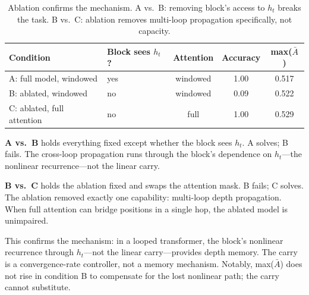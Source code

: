 \documentclass[11pt]{article}
\begin{document}
\begin{table}[ht]
\centering
\begin{tabular}{@{}llccc@{}}
\toprule
Condition & Block sees $h_t$? & Attention & Accuracy & max($\bar{A}$) \\
\midrule
A: full model, windowed & yes & windowed & 1.00 & 0.517 \\
B: ablated, windowed & no & windowed & 0.09 & 0.522 \\
C: ablated, full attention & no & full & 1.00 & 0.529 \\
\bottomrule
\end{tabular}
\caption{Ablation confirms the mechanism. A vs.\ B: removing block's access to $h_t$ breaks the task. B vs.\ C: ablation removes multi-loop propagation specifically, not capacity.}
\label{tab:ablation}
\end{table}

\textbf{A vs.\ B} holds everything fixed except whether the block sees $h_t$. A solves; B fails. The cross-loop propagation runs through the block's dependence on $h_t$---the nonlinear recurrence---not the linear carry.

\textbf{B vs.\ C} holds the ablation fixed and swaps the attention mask. B fails; C solves. The ablation removed exactly one capability: multi-loop depth propagation. When full attention can bridge positions in a single hop, the ablated model is unimpaired.

This confirms the mechanism: in a looped transformer, the block's nonlinear recurrence through $h_t$---not the linear carry---provides depth memory. The carry is a convergence-rate controller, not a memory mechanism. Notably, max($\bar{A}$) does not rise in condition B to compensate for the lost nonlinear path; the carry cannot substitute.
\end{document}
